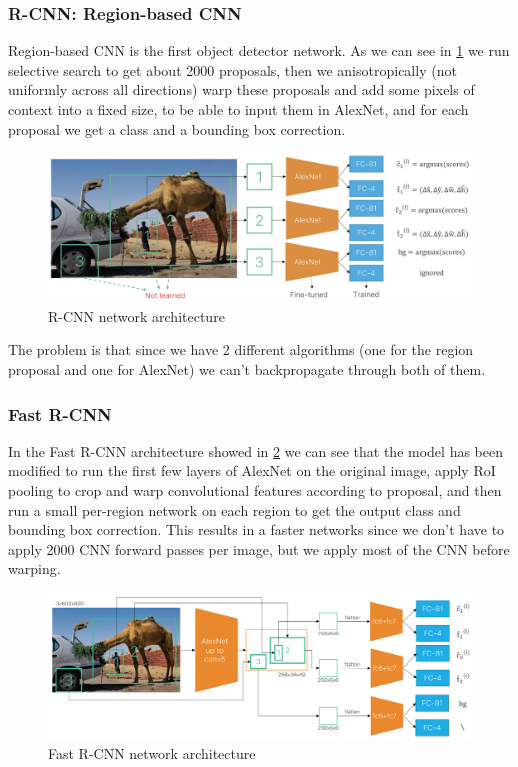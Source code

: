 \subsubsection{R-CNN: Region-based CNN}

Region-based CNN is the first object detector network.
As we can see in \ref{fig:rcnn} we run selective search to get about 2000 proposals, then we anisotropically (not uniformly across all directions) warp these proposals and add some pixels of context into a fixed size, to be able to input them in AlexNet, and for each proposal we get a class and a bounding box correction.

\begin{figure}[htbp]
  \centering
  \includegraphics[width=0.6\linewidth]{./img/rcnn.jpg}
  \caption{R-CNN network architecture}
  \label{fig:rcnn}
\end{figure}

The problem is that since we have 2 different algorithms (one for the region proposal and one for AlexNet) we can't backpropagate through both of them.

\subsubsection{Fast R-CNN}

In the Fast R-CNN architecture showed in \ref{fig:fastrcnn} we can see that the model has been modified to run the first few layers of AlexNet on the original image, apply RoI pooling to crop and warp convolutional features according to proposal, and then run a small per-region network on each region to get the output class and bounding box correction.
This results in a faster networks since we don't have to apply 2000 CNN forward passes per image, but we apply most of the CNN before warping.

\begin{figure}[htbp]
  \centering
  \includegraphics[width=0.6\linewidth]{./img/fastrcnn.png}
  \caption{Fast R-CNN network architecture}
  \label{fig:fastrcnn}
\end{figure}


